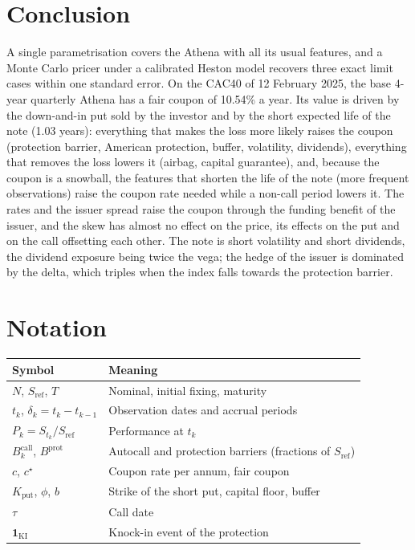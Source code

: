 \documentclass[11pt,a4paper]{article}
\newcommand{\ind}{\mathbf{1}}
\newcommand{\Sref}{S_{\mathrm{ref}}}
\begin{document}
\section{Conclusion}
A single parametrisation covers the Athena with all its usual features, and a Monte Carlo pricer under a
calibrated Heston model recovers three exact limit cases within one standard error. On the CAC40 of
12 February 2025, the base 4-year quarterly Athena has a fair coupon of 10.54\% a year. Its value is driven by the
down-and-in put sold by the investor and by the short expected life of the note (1.03 years): everything that makes
the loss more likely raises the coupon (protection barrier, American protection, buffer, volatility, dividends),
everything that removes the loss lowers it (airbag, capital guarantee), and, because the coupon is a snowball, the
features that shorten the life of the note (more frequent observations) raise the coupon rate needed while a
non-call period lowers it. The rates and the issuer spread raise the coupon through the funding benefit of the
issuer, and the skew has almost no effect on the price, its effects on the put and on the call offsetting each
other. The note is short volatility and short dividends, the dividend exposure being twice the vega; the hedge of
the issuer is dominated by the delta, which triples when the index falls towards the protection barrier.

\appendix
\section{Notation}
\begin{center}
\begin{tabular}{@{}ll@{}}
\toprule
Symbol & Meaning \\
\midrule
$N$, $\Sref$, $T$ & Nominal, initial fixing, maturity \\
$t_k$, $\delta_k = t_k - t_{k-1}$ & Observation dates and accrual periods \\
$P_k = S_{t_k}/\Sref$ & Performance at $t_k$ \\
$B^{\mathrm{call}}_k$, $B^{\mathrm{prot}}$ & Autocall and protection barriers (fractions of $\Sref$) \\
$c$, $c^\star$ & Coupon rate per annum, fair coupon \\
$K_{\mathrm{put}}$, $\phi$, $b$ & Strike of the short put, capital floor, buffer \\
$\tau$ & Call date \\
$\ind_{\mathrm{KI}}$ & Knock-in event of the protection \\
\bottomrule
\end{tabular}
\end{center}
\end{document}

